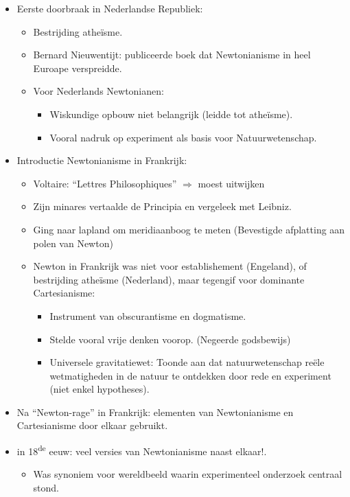 \documentclass{article}
\begin{document}
\begin{itemize}
\begin{itemize}
      \end{itemize}
      \item Eerste doorbraak in Nederlandse Republiek:
      \begin{itemize}
        \item Bestrijding athe\"isme.
        \item Bernard Nieuwentijt: publiceerde boek dat Newtonianisme in heel Euroape verspreidde.
        \item Voor Nederlands Newtonianen:
        \begin{itemize}
          \item Wiskundige opbouw niet belangrijk (leidde tot athe\"isme).
          \item Vooral nadruk op experiment als basis voor Natuurwetenschap.
        \end{itemize}
      \end{itemize}
      \item Introductie Newtonianisme in Frankrijk:
      \begin{itemize}
        \item Voltaire: ``Lettres Philosophiques'' $\Rightarrow$ moest uitwijken
        \item Zijn minares vertaalde de Principia en vergeleek met Leibniz.
        \item Ging naar lapland om meridiaanboog te meten (Bevestigde afplatting aan polen van Newton)
        \item Newton in Frankrijk was niet voor establishement (Engeland), of bestrijding athe\"isme (Nederland), maar tegengif voor dominante Cartesianisme:
        \begin{itemize}
          \item Instrument van obscurantisme en dogmatisme.
          \item Stelde vooral vrije denken voorop. (Negeerde godsbewijs)
          \item Universele gravitatiewet: Toonde aan dat natuurwetenschap re\"ele wetmatigheden in de natuur te ontdekken door rede en experiment (niet enkel hypotheses).
        \end{itemize}
      \end{itemize}
      \item Na ``Newton-rage'' in Frankrijk: elementen van Newtonianisme en Cartesianisme door elkaar gebruikt.
      \item in 18\textsuperscript{de} eeuw: veel versies van Newtonianisme naast elkaar!.
      \begin{itemize}
        \item Was synoniem voor wereldbeeld waarin experimenteel onderzoek centraal stond.
      \end{itemize}
    \end{itemize}
\end{document}
